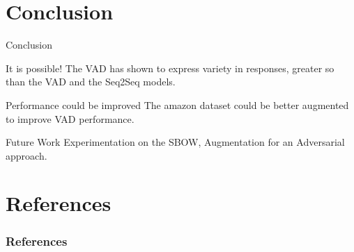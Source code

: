 \documentclass[aspectratio=169, 11pt]{beamer}
\begin{document}
\section{Conclusion}
\begin{frame}{Conclusion}
  \begin{block}{It is possible!}
    The VAD has shown to express variety in responses, greater so than the VAD and the Seq2Seq models.
  \end{block}
  \begin{block}{Performance could be improved}
    The amazon dataset could be better augmented to improve VAD performance.
  \end{block}
  \begin{block}{Future Work}
    Experimentation on the SBOW, Augmentation for an Adversarial approach.
  \end{block}
  
\end{frame} 


\section*{References}
\begin{frame}[allowframebreaks]
  \frametitle{References} 
  \small
  
   
\end{frame}
\end{document}

